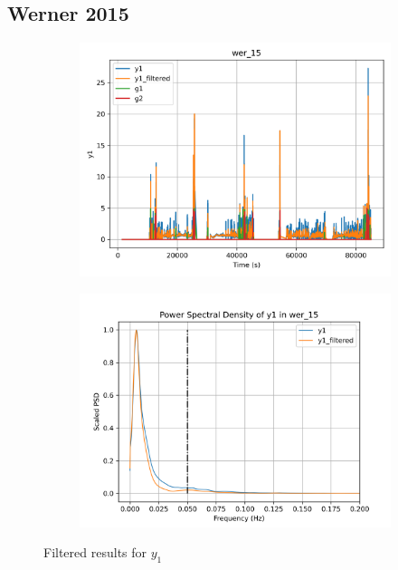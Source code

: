 \graphicspath{{Appendices/apx1_signal_est}}
\subsection{Werner 2015}

\begin{figure}[H]

\begin{minipage}{0.49\textwidth}
        \begin{figure}[H]
                \centering
                \includegraphics[width = \textwidth]{./figs/trk_filt/wer_15/y1.png}
        \end{figure}
\end{minipage}
\begin{minipage}{0.49\textwidth}
        \begin{figure}[H]
                \centering
                \includegraphics[width = \textwidth]{./figs/trk_filt/wer_15/y1_psd.png}
        \end{figure}
\end{minipage}
\caption{Filtered results for $y_1$}

\end{figure}


